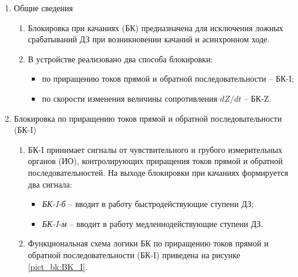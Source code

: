 \color{black}

\begin{enumerate}
\item Общие сведения

\begin{enumerate}

\item
Блокировка при качаниях (БК) предназначена для исключения ложных срабатываний ДЗ при
возникновении качаний и асинхронном ходе.

\item 
В устройстве реализовано два способа блокировки:

\begin{itemize}
\item по приращению токов прямой и обратной последовательности -- БК-I;
\item по скорости изменения величины сопротивления $dZ/dt$ -- БК-Z.
\end{itemize}

\end{enumerate}


\item  Блокировка по приращению токов прямой и обратной последовательности (БК-I)

\begin{enumerate}

\item 
БК-I принимает сигналы от чувствительного и грубого измерительных органов (ИО), контролирующих
приращения токов прямой и обратной последовательностей. На выходе блокировки при качаниях формируется
два сигнала:
\begin{itemize}
\item \textit{БК-I-б} -- вводит в работу быстродействующие ступени ДЗ;
\item \textit{БК-I-м} -- вводит в работу медленнодействующие ступени ДЗ.
\end{itemize}

\item
Функциональная схема логики БК по приращению токов прямой и обратной последовательности (БК-I) приведена на рисунке \ref{pict_bk:BK_I}.


\end{enumerate}
\end{enumerate}
